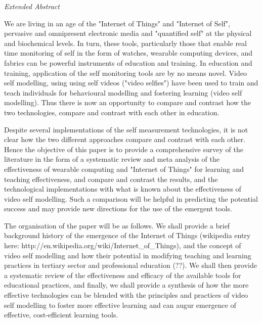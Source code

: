 \textit{Extended Abstract} 

We are living in an age of the "Internet of Things" and "Internet of Self", pervasive and omnipresent electronic media and "quantified self" at the physical and biochemical levels. In turn, these tools, particularly those that enable real time monitoring of self in the form of watches, wearable computing devices, and fabrics can be powerful instruments of education and training. In education and training, application of the self monitoring tools are by no means novel. Video self modelling, using using self videos ("video selfies") have been used to train and teach individuals for behavioural modelling and fostering learning (video self modelling). Thus there is now an opportunity to compare and contrast how the two technologies, compare and contrast with each other in education. 

Despite several implementations of the self measurement technologies, it is not clear how the two different approaches compare and contrast with each other. Hence the objective of this paper is to provide a comprehensive survey of the literature in the form of a systematic review and meta analysis of the effectiveness of wearable computing and "Internet of Things" for learning and teaching effectiveness, and compare and contrast the results, and the technological implementations with what is known about the effectiveness of video self modelling. Such a comparison will be helpful in predicting the potential success and may provide new directions for the use of the emergent tools.

The organisation of the paper will be as follows. We shall provide a brief background history of the emergence of the Internet of Things (wikipedia entry here: http://en.wikipedia.org/wiki/Internet_of_Things), and the concept of video self modelling and how their potential in modifying teaching and learning practices in tertiary sector and professional education (??). We shall then provide a systematic review of the effectiveness and efficacy of the available tools for educational practices, and finally, we shall provide a synthesis of how the more effective technologies can be blended with the principles and practices of video self modelling to foster more effective learning and can augur emergence of effective, cost-efficient learning tools.

